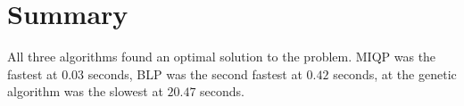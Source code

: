 \documentclass{article}
\begin{document}
\FloatBarrier{}
\section{Summary}

All three algorithms found an optimal solution to the problem. MIQP was the
fastest at $0.03$ seconds, BLP was the second fastest at $0.42$ seconds, at the
genetic algorithm was the slowest at $20.47$ seconds.

\FloatBarrier{}


\end{document}
